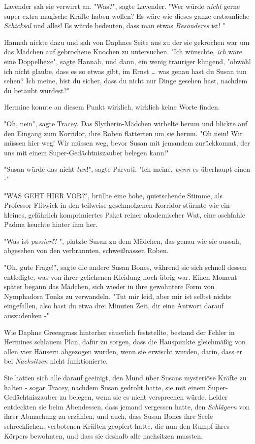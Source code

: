 {Lavender sah sie verwirrt an. "Was?", sagte Lavender. "Wer würde \emph{nicht} gerne super extra magische Kräfte haben wollen? Es wäre wie dieses ganze erstaunliche \emph{Schicksal} und alles! Es würde bedeuten, dass man etwas \emph{Besonderes} ist! "

Hannah nickte dazu und sah von Daphnes Seite aus zu der sie gekrochen war um das Mädchen auf gebrochene Knochen zu untersuchen. "Ich wünschte, \emph{ich} wäre eine Doppelhexe", sagte Hannah, und dann, ein wenig trauriger klingend, "obwohl ich nicht glaube, dass es so etwas gibt, im Ernst … was genau hast du Susan tun sehen? Ich meine, bist du sicher, dass du nicht nur Dinge gesehen hast, nachdem du betäubt wurdest?"

Hermine konnte an diesem Punkt wirklich, wirklich keine Worte finden.

"Oh, nein", sagte Tracey. Das Slytherin-Mädchen wirbelte herum und blickte auf den Eingang zum Korridor, ihre Roben flatterten um sie herum. "Oh nein! Wir müssen hier weg! Wir müssen weg, bevor Susan mit jemandem zurückkommt, der uns mit einem Super-Gedächtniszauber belegen kann!"

"Susan würde das nicht \emph{tun}!", sagte Parvati. "Ich meine, \emph{wenn} es überhaupt einen -"

"WAS GEHT HIER VOR?", brüllte eine hohe, quietschende Stimme, als Professor Flitwick in den teilweise geschmolzenen Korridor stürmte wie ein kleines, gefährlich komprimiertes Paket reiner akademischer Wut, eine aschfahle Padma keuchte hinter ihm her.

"Was ist \emph{passiert}? ", platzte Susan zu dem Mädchen, das genau wie sie aussah, abgesehen von den verbrannten, schweißnassen Roben.

"Oh, gute Frage!", sagte die andere Susan Bones, während sie sich schnell dessen entledigte, was von ihrer geliehenen Kleidung noch übrig war. Einen Moment später begann das Mädchen, sich wieder in ihre gewohntere Form von Nymphadora Tonks zu verwandeln. "Tut mir leid, aber mir ist selbst nichts eingefallen, also hast du etwa drei Minuten Zeit, dir eine Antwort darauf auszudenken -"

Wie Daphne Greengrass hinterher säuerlich feststellte, bestand der Fehler in Hermines schlauem Plan, dafür zu sorgen, dass die Hauspunkte gleichmäßig von allen vier Häusern abgezogen wurden, wenn sie erwischt wurden, darin, dass er bei \emph{Nachsitzen} nicht funktionierte.

Sie hatten sich alle darauf geeinigt, den Mund über Susans mysteriöse Kräfte zu halten - sogar Tracey, nachdem Susan gedroht hatte, sie mit einem Super-Gedächtniszauber zu belegen, wenn sie es nicht versprechen würde. Leider entdeckten sie beim Abendessen, dass jemand vergessen hatte, den \emph{Schlägern} von ihrer Abmachung zu erzählen, und auch, dass Susan Bones ihre Seele schrecklichen, verbotenen Kräften geopfert hatte, die nun den Rumpf ihres Körpers bewohnten, und dass sie deshalb alle nachsitzen mussten.

}
